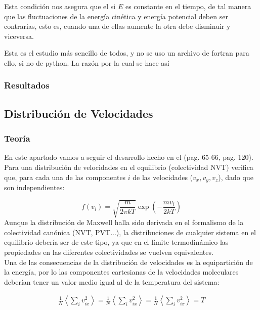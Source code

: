 \documentclass[11pt]{article} %
\newcommand{\parentesis}[1]{\left( #1  \right)}
\begin{document}
Esta condición nos asegura que el si $E$ es constante en el tiempo, de tal manera que las fluctuaciones de la energía cinética y energía potencial deben ser contrarias, esto es, cuando una de ellas aumente la otra debe disminuir y viceversa. 

Esta es el estudio más sencillo de todos, y no se uso un archivo de fortran para ello, si no de python. La razón por la cual se hace así

\subsubsection{Resultados}

	
\subsection{Distribución de Velocidades}
	
\subsubsection{Teoría}

En este apartado vamos a seguir el desarrollo hecho en el \cite{Haile} (pag. 65-66, pag. 120). Para una distribución de velocidades en el equilibrio (colectividad NVT) verifica que, para cada una de las componentes $i$ de las velocidades ($v_x,v_y,v_z$), dado que son independientes: 

\begin{equation}
	f(v_i) = \sqrt{\frac{m}{2\pi k T}} \exp \parentesis{- \frac{mv_i}{2kT}}
\end{equation}
Aunque la distribución de Maxwell halla sido derivada en el formalismo de la colectividad canónica (NVT, PVT...), la distribuciones de cualquier sistema en el equilibrio debería ser de este tipo, ya que en el límite termodinámico las propiedades en las diferentes colectividades se vuelven equivalentes. \\

Una de las consecuencias de la distribución de velocidades es la equipartición de la energía, por lo las componentes cartesianas de la velocidades moleculares deberían tener un valor medio igual al de la temperatura del sistema:

\begin{eqnarray}
	\frac{1}{N} \left\langle \sum_i v_{ix}^2 \right\rangle = 
	\frac{1}{N} \left\langle \sum_i v_{ix}^2 \right\rangle = 
	\frac{1}{N} \left\langle \sum_i v_{ix}^2 \right\rangle = T
\end{eqnarray}
\end{document}
